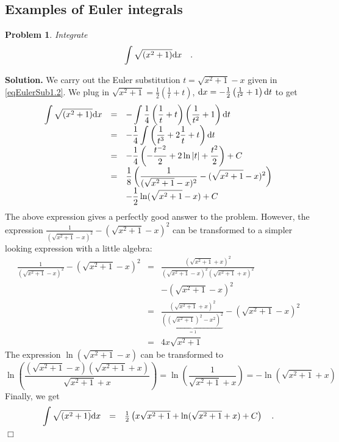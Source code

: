 \documentclass[12pt]{book}
\newenvironment{solution}{\medskip\noindent\textbf{Solution.} }{$\Box$}
\newtheorem{problem}[theorem]{Problem}
\begin{document}
\subsection{Examples of Euler integrals}
\begin{problem}
Integrate
\[
\int \sqrt{(x^2+1)}{\normalfont \text{d}} x\quad .
\]
\end{problem}
\begin{solution}
We carry out the Euler substitution $t=\sqrt{x^2+1}-x$ given in \eqref{eqEulerSub1.2}. We plug in $\sqrt{x^2+1}=\frac{1}2\left(\frac 1 t +t\right)$, ${\normalfont \text{d}} x=-\frac12 \left(\frac1{t^2} +1\right){\normalfont \text{d}} t$ to get
\[
\begin{array}{rcl}
\displaystyle\int \sqrt{(x^2+1)}{\normalfont \text{d}} x&=&\displaystyle-\int  \frac14 \left(\frac1t +t\right)\left(\frac 1 {t^2} +1\right){\normalfont \text{d}} t\\
&=&\displaystyle -\frac 1 4\int \left( \frac{1}{t^3}+ 2\frac{1}t +t\right){\normalfont \text{d}} t\\
&=&\displaystyle -\frac{1}4 \left(-\frac{t^{-2}}{2}+2\ln|t|+\frac{t^2}2 \right)+C\\
&=&\displaystyle\frac{1}{8} \left(\frac{1}{(\sqrt{x^2+1} - x )^2 }
- (\sqrt{x^2+1}-x)^2\right)\\
&&\displaystyle -\frac12 \ln (\sqrt{x^2+1}-x)+C
\end{array}
\]
The above expression gives a perfectly good answer to the problem. However, the expression $\frac{1}{(\sqrt{x^2 +1}- x)^2 }- (\sqrt{x^2+1}-x)^2$ can be transformed to a simpler looking expression with a little algebra:
\[\begin{array}{rcl}
\displaystyle\frac{1}{(\sqrt{x^2+1}-x)^2}- (\sqrt{x^2+1}-x)^2&=&\displaystyle
\frac{(\sqrt{x^2+1}+x)^2}{(\sqrt{x^2+1}-x)^2  (\sqrt{x^2+1}+x)^2 } \\
&&\displaystyle - (\sqrt{x^2+1}-x)^2 \\
&=&\displaystyle \frac{(\sqrt{x^2+1}+x)^2}{\underbrace{((\sqrt{x^2+1})^2-x^2)^2}_{=1} }- (\sqrt{x^2+1}-x)^2 \\
&=&\displaystyle 4x\sqrt{x^2+1}
\end{array}
\]
The expression $\ln (\sqrt{x^2+1}-x)$ can be transformed to
\[
\ln \left(\frac{(\sqrt{x^2+1}-x)(\sqrt{x^2+1}+x)}{\sqrt{x^2+1}+x}\right)=\ln \left(\frac{1}{\sqrt{x^2+1}+x}\right)= -\ln (\sqrt{x^2+1}+x)
\]
Finally, we get
\[
\begin{array}{rcl}
\displaystyle \int \sqrt{(x^2+1)}{\normalfont \text{d}} x&=&\frac{1}2\left(x\sqrt{x^2+1}+\ln (\sqrt{x^2+1}+x)+C \right)\quad .
\end{array}
\]
\end{solution}
\end{document}
